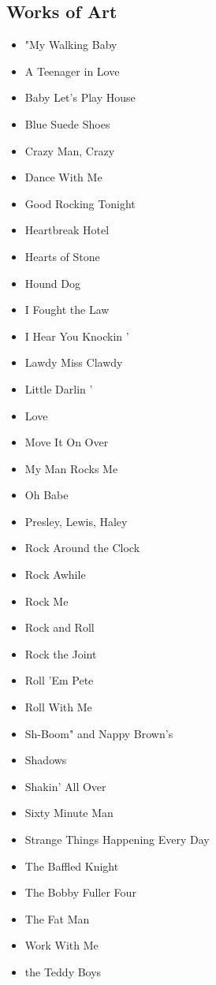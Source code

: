 \documentclass[12pt,a4paper]{article}
\begin{document}
\subsection{Works of Art}
\begin{itemize}
  \item "My Walking Baby
  \item A Teenager in Love
  \item Baby Let's Play House
  \item Blue Suede Shoes
  \item Crazy Man, Crazy
  \item Dance With Me
  \item Good Rocking Tonight
  \item Heartbreak Hotel
  \item Hearts of Stone
  \item Hound Dog
  \item I Fought the Law
  \item I Hear You Knockin '
  \item Lawdy Miss Clawdy
  \item Little Darlin '
  \item Love
  \item Move It On Over
  \item My Man Rocks Me
  \item Oh Babe
  \item Presley, Lewis, Haley
  \item Rock Around the Clock
  \item Rock Awhile
  \item Rock Me
  \item Rock and Roll
  \item Rock the Joint
  \item Roll 'Em Pete
  \item Roll With Me
  \item Sh-Boom" and Nappy Brown's
  \item Shadows
  \item Shakin' All Over
  \item Sixty Minute Man
  \item Strange Things Happening Every Day
  \item The Baffled Knight
  \item The Bobby Fuller Four
  \item The Fat Man
  \item Work With Me
  \item the Teddy Boys
\end{itemize}
\end{document}
